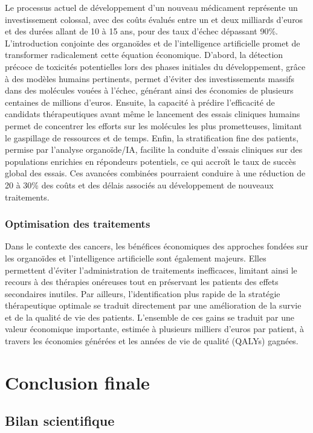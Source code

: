 Le processus actuel de développement d’un nouveau médicament représente un investissement colossal, avec des coûts évalués entre un et deux milliards d'euros et des durées allant de 10 à 15 ans, pour des taux d'échec dépassant 90\%. L’introduction conjointe des organoïdes et de l’intelligence artificielle promet de transformer radicalement cette équation économique. D’abord, la détection précoce de toxicités potentielles lors des phases initiales du développement, grâce à des modèles humains pertinents, permet d’éviter des investissements massifs dans des molécules vouées à l’échec, générant ainsi des économies de plusieurs centaines de millions d’euros. Ensuite, la capacité à prédire l’efficacité de candidats thérapeutiques avant même le lancement des essais cliniques humains permet de concentrer les efforts sur les molécules les plus prometteuses, limitant le gaspillage de ressources et de temps. Enfin, la stratification fine des patients, permise par l’analyse organoïde/IA, facilite la conduite d’essais cliniques sur des populations enrichies en répondeurs potentiels, ce qui accroît le taux de succès global des essais. Ces avancées combinées pourraient conduire à une réduction de 20 à 30\% des coûts et des délais associés au développement de nouveaux traitements.

\subsubsection{Optimisation des traitements}

Dans le contexte des cancers, les bénéfices économiques des approches fondées sur les organoïdes et l’intelligence artificielle sont également majeurs. Elles permettent d’éviter l’administration de traitements inefficaces, limitant ainsi le recours à des thérapies onéreuses tout en préservant les patients des effets secondaires inutiles. Par ailleurs, l’identification plus rapide de la stratégie thérapeutique optimale se traduit directement par une amélioration de la survie et de la qualité de vie des patients. L’ensemble de ces gains se traduit par une valeur économique importante, estimée à plusieurs milliers d’euros par patient, à travers les économies générées et les années de vie de qualité (QALYs) gagnées.

\section{Conclusion finale}

\subsection{Bilan scientifique}

